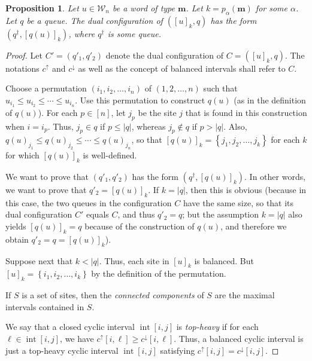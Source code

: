 \documentclass[reqno]{amsart}
\newcommand{\0}{\phantom{c}}
\DeclareMathOperator{\inter}{int} %
\newcommand{\mm}{\mathbf{m}}
\newcommand{\mcW}{\mathcal{W}}
\newenvironment{verlong}{}{}
\newcommand{\set}[1]{\left\{ #1 \right\}}
\newcommand{\abs}[1]{\left| #1 \right|}
\newcommand{\tup}[1]{\left( #1 \right)}
\newcommand{\ive}[1]{\left[ #1 \right]}
\newcommand{\defn}[1]{{\color{darkred}\emph{#1}}} %
\theoremstyle{plain}
\newtheorem{prop}[thm]{Proposition}
\theoremstyle{definition}
\numberwithin{equation}{section}
\begin{document}
\begin{verlong}
\begin{prop} \label{prop:SL.dual-old6}
Let $u \in \mcW_n$ be a word of type $\mm$.
Let $k = p_{\alpha}(\mm)$ for some $\alpha$.
Let $q$ be a queue.
The dual configuration of $\tup{ [u]_k , q }$ has the form $\tup{q^{\dagger} , [q(u)]_k }$, where $q^{\dagger}$ is some queue.
\end{prop}

\begin{proof} %
Let $C' = (q'_1, q'_2)$ denote the dual configuration of $C = \tup{ [u]_k , q }$.
The notations $c^{\uparrow}$ and $c^{\downarrow}$ as well as the concept of balanced
intervals shall refer to $C$.

Choose a permutation $\tup{i_1, i_2, \ldots, i_n}$ of $\tup{1, 2, \ldots, n}$
such that $u_{i_1} \leq u_{i_2} \leq \cdots \leq u_{i_n}$.
Use this permutation to construct $q(u)$ (as in the definition of $q(u)$).
For each $p \in \ive{n}$, let $j_p$ be the site $j$ that is found in this construction when $i = i_p$.
Thus, $j_p \in q$ if $p \leq \abs{q}$, whereas $j_p \notin q$ if $p > \abs{q}$.
Also, $q(u)_{j_1} \leq q(u)_{j_2} \leq \cdots \leq q(u)_{j_n}$, so that
$[q(u)]_k = \set{j_1, j_2, \ldots, j_k}$ for each $k$ for which $[q(u)]_k$ is well-defined.

We want to prove that $(q'_1, q'_2)$ has the form $\tup{q^{\dagger} , [q(u)]_k }$.
In other words, we want to prove that $q'_2 = [q(u)]_k$.
If $k = \abs{q}$, then this is obvious (because in this case, the two queues in the configuration $C$ have the same size, so that its dual configuration $C'$ equals $C$, and thus $q'_2 = q$; but the assumption $k = \abs{q}$ also yields $[q(u)]_k = q$ because of the construction of $q(u)$, and therefore we obtain $q'_2 = q = [q(u)]_k$).

Suppose next that $k < \abs{q}$.
Thus, each site in $[u]_k$ is balanced.
But $[u]_k = \set{i_1, i_2, \ldots, i_k}$ by the definition of the permutation.

If $S$ is a set of sites, then the \defn{connected components} of $S$ are the maximal intervals contained in $S$.

We say that a closed cyclic interval $\inter[i,j]$ is \defn{top-heavy} if for each $\ell \in \inter[i,j]$, we have $c^\uparrow[i,\ell] \geq c^\downarrow[i,\ell]$.
Thus, a balanced cyclic interval is just a top-heavy cyclic interval $\inter[i,j]$ satisfying $c^{\uparrow}[i,j] = c^{\downarrow}[i,j]$.


\end{proof}
\end{verlong}
\end{document}
